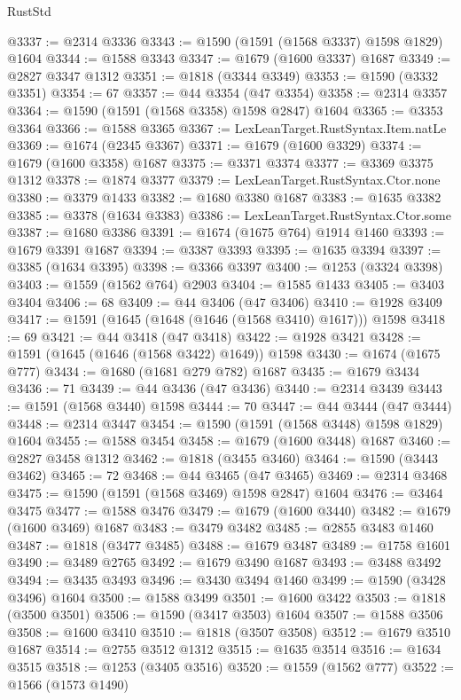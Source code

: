 \begin{lexlean}{RustStd}
\begin{coremodule}
@3337 := @2314 @3336
@3343 := @1590 (@1591 (@1568 @3337) @1598 @1829) @1604
@3344 := @1588 @3343
@3347 := @1679 (@1600 @3337) @1687
@3349 := @2827 @3347 @1312
@3351 := @1818 (@3344 @3349)
@3353 := @1590 (@3332 @3351)
@3354 := 67
@3357 := @44 @3354 (@47 @3354)
@3358 := @2314 @3357
@3364 := @1590 (@1591 (@1568 @3358) @1598 @2847) @1604
@3365 := @3353 @3364
@3366 := @1588 @3365
@3367 := LexLeanTarget.RustSyntax.Item.natLe
@3369 := @1674 (@2345 @3367)
@3371 := @1679 (@1600 @3329)
@3374 := @1679 (@1600 @3358) @1687
@3375 := @3371 @3374
@3377 := @3369 @3375 @1312
@3378 := @1874 @3377
@3379 := LexLeanTarget.RustSyntax.Ctor.none
@3380 := @3379 @1433
@3382 := @1680 @3380 @1687
@3383 := @1635 @3382
@3385 := @3378 (@1634 @3383)
@3386 := LexLeanTarget.RustSyntax.Ctor.some
@3387 := @1680 @3386
@3391 := @1674 (@1675 @764) @1914 @1460
@3393 := @1679 @3391 @1687
@3394 := @3387 @3393
@3395 := @1635 @3394
@3397 := @3385 (@1634 @3395)
@3398 := @3366 @3397
@3400 := @1253 (@3324 @3398)
@3403 := @1559 (@1562 @764) @2903
@3404 := @1585 @1433
@3405 := @3403 @3404
@3406 := 68
@3409 := @44 @3406 (@47 @3406)
@3410 := @1928 @3409
@3417 := @1591 (@1645 (@1648 (@1646 (@1568 @3410) @1617))) @1598
@3418 := 69
@3421 := @44 @3418 (@47 @3418)
@3422 := @1928 @3421
@3428 := @1591 (@1645 (@1646 (@1568 @3422) @1649)) @1598
@3430 := @1674 (@1675 @777)
@3434 := @1680 (@1681 @279 @782) @1687
@3435 := @1679 @3434
@3436 := 71
@3439 := @44 @3436 (@47 @3436)
@3440 := @2314 @3439
@3443 := @1591 (@1568 @3440) @1598
@3444 := 70
@3447 := @44 @3444 (@47 @3444)
@3448 := @2314 @3447
@3454 := @1590 (@1591 (@1568 @3448) @1598 @1829) @1604
@3455 := @1588 @3454
@3458 := @1679 (@1600 @3448) @1687
@3460 := @2827 @3458 @1312
@3462 := @1818 (@3455 @3460)
@3464 := @1590 (@3443 @3462)
@3465 := 72
@3468 := @44 @3465 (@47 @3465)
@3469 := @2314 @3468
@3475 := @1590 (@1591 (@1568 @3469) @1598 @2847) @1604
@3476 := @3464 @3475
@3477 := @1588 @3476
@3479 := @1679 (@1600 @3440)
@3482 := @1679 (@1600 @3469) @1687
@3483 := @3479 @3482
@3485 := @2855 @3483 @1460
@3487 := @1818 (@3477 @3485)
@3488 := @1679 @3487
@3489 := @1758 @1601
@3490 := @3489 @2765
@3492 := @1679 @3490 @1687
@3493 := @3488 @3492
@3494 := @3435 @3493
@3496 := @3430 @3494 @1460
@3499 := @1590 (@3428 @3496) @1604
@3500 := @1588 @3499
@3501 := @1600 @3422
@3503 := @1818 (@3500 @3501)
@3506 := @1590 (@3417 @3503) @1604
@3507 := @1588 @3506
@3508 := @1600 @3410
@3510 := @1818 (@3507 @3508)
@3512 := @1679 @3510 @1687
@3514 := @2755 @3512 @1312
@3515 := @1635 @3514
@3516 := @1634 @3515
@3518 := @1253 (@3405 @3516)
@3520 := @1559 (@1562 @777)
@3522 := @1566 (@1573 @1490)

\end{coremodule}
\end{lexlean}
